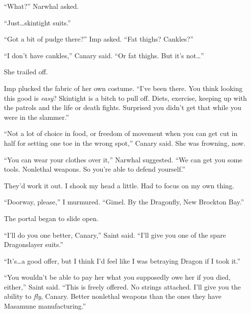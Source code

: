 ``What?'' Narwhal asked.



``Just\ldots skintight suits.''



``Got a bit of pudge there?'' Imp asked.  ``Fat thighs?  Cankles?''



``I don't have cankles,'' Canary said.  ``Or fat thighs.  But it's not\ldots''



She trailed off.



Imp plucked the fabric of her own costume. ``I've been there.  You think looking this good is \emph{easy}?  Skintight is a bitch to pull off.  Diets, exercise, keeping up with the patrols and the life or death fights.  Surprised you didn't get that while you were in the slammer.''



``Not a lot of choice in food, or freedom of movement when you can get cut in half for setting one toe in the wrong spot,'' Canary said.  She was frowning, now.



``You can wear your clothes over it,'' Narwhal suggested.  ``We can get you some tools.  Nonlethal weapons.  So you're able to defend yourself.''



They'd work it out.  I shook my head a little.  Had to focus on my own thing.



``Doorway, please,'' I murmured.  ``Gimel.  By the Dragonfly, New Brockton Bay.''



The portal began to slide open.



``I'll do you one better, Canary,'' Saint said.  ``I'll give you one of the spare Dragonslayer suits.''



``It's\ldots a good offer, but I think I'd feel like I was betraying Dragon if I took it.''



``You wouldn't be able to pay her what you supposedly owe her if you died, either,'' Saint said.  ``This is freely offered.  No strings attached.  I'll give you the ability to \emph{fly}, Canary.  Better nonlethal weapons than the ones they have Masamune manufacturing.''



